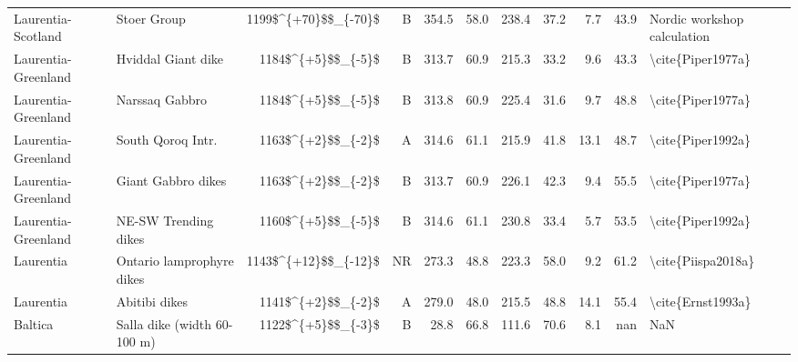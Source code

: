 \begin{longtable}{p{1 in}p{1 in}rrrrrrrr}
            Laurentia-Scotland &                                        Stoer Group &   1199\$\textasciicircum \{+70\}\$\$\_\{-70\}\$ &      B &     354.5 &      58.0 & 238.4 &  37.2 &       7.7 &        43.9 &                        Nordic workshop calculation \\
           Laurentia-Greenland &                                 Hviddal Giant dike &     1184\$\textasciicircum \{+5\}\$\$\_\{-5\}\$ &      B &     313.7 &      60.9 & 215.3 &  33.2 &       9.6 &        43.3 &                                  \textbackslash cite\{Piper1977a\} \\
           Laurentia-Greenland &                                     Narssaq Gabbro &     1184\$\textasciicircum \{+5\}\$\$\_\{-5\}\$ &      B &     313.8 &      60.9 & 225.4 &  31.6 &       9.7 &        48.8 &                                  \textbackslash cite\{Piper1977a\} \\
           Laurentia-Greenland &                                  South Qoroq Intr. &     1163\$\textasciicircum \{+2\}\$\$\_\{-2\}\$ &      A &     314.6 &      61.1 & 215.9 &  41.8 &      13.1 &        48.7 &                                  \textbackslash cite\{Piper1992a\} \\
           Laurentia-Greenland &                                 Giant Gabbro dikes &     1163\$\textasciicircum \{+2\}\$\$\_\{-2\}\$ &      B &     313.7 &      60.9 & 226.1 &  42.3 &       9.4 &        55.5 &                                  \textbackslash cite\{Piper1977a\} \\
           Laurentia-Greenland &                               NE-SW Trending dikes &     1160\$\textasciicircum \{+5\}\$\$\_\{-5\}\$ &      B &     314.6 &      61.1 & 230.8 &  33.4 &       5.7 &        53.5 &                                  \textbackslash cite\{Piper1992a\} \\
                     Laurentia &                          Ontario lamprophyre dikes &   1143\$\textasciicircum \{+12\}\$\$\_\{-12\}\$ &     NR &     273.3 &      48.8 & 223.3 &  58.0 &       9.2 &        61.2 &                                 \textbackslash cite\{Piispa2018a\} \\
                     Laurentia &                                      Abitibi dikes &     1141\$\textasciicircum \{+2\}\$\$\_\{-2\}\$ &      A &     279.0 &      48.0 & 215.5 &  48.8 &      14.1 &        55.4 &                                  \textbackslash cite\{Ernst1993a\} \\
                       Baltica &                        Salla dike (width 60-100 m) &     1122\$\textasciicircum \{+5\}\$\$\_\{-3\}\$ &      B &      28.8 &      66.8 & 111.6 &  70.6 &       8.1 &         nan &                                                NaN \\

\end{longtable}
